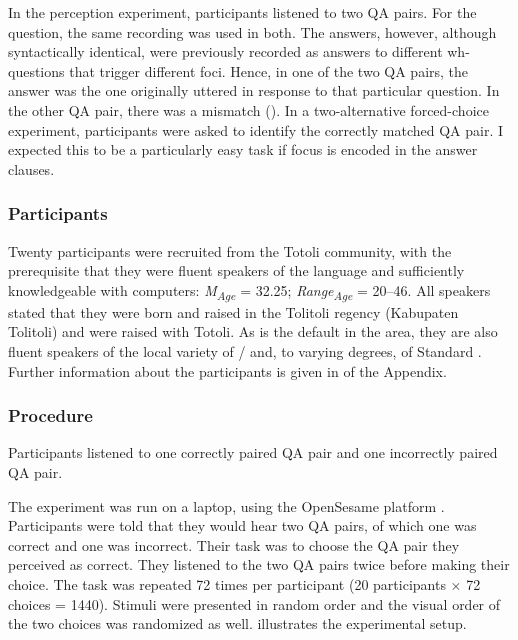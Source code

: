 In the perception experiment, participants listened to two QA pairs. For the question, the same recording was used in both. The answers, however, although syntactically identical, were previously recorded as answers to different wh-questions that trigger different foci. Hence, in one of the two QA pairs, the answer was the one originally uttered in response to that particular question. In the other QA pair, there was a mismatch (). In a two-alternative forced-choice experiment, participants were asked to identify the correctly matched QA pair. I expected this to be a particularly easy task if focus is encoded in the answer clauses.





\subsubsection{Participants}



Twenty participants were recruited from the Totoli community, with the prerequisite that they were fluent speakers of the language and sufficiently knowledgeable with computers: \textit{M\textsubscript{Age}} = 32.25; \textit{Range\textsubscript{Age}} = 20--46. All speakers stated that they were born and raised in the  Tolitoli regency (Kabupaten Tolitoli) and were raised with Totoli. As is the default in the area, they are also fluent speakers of the local variety of /  and, to varying degrees, of Standard . Further information about the participants is given in   of the Appendix. 




\subsubsection{Procedure}


Participants  listened to one correctly paired QA pair and one incorrectly paired QA pair.  

The experiment was run on a laptop, using the OpenSesame platform \citep{mathot2012opensesame}.  Participants were told that they would hear two QA pairs, of which one was correct and one was incorrect. Their task was to choose the QA pair they perceived as correct. They listened to the two QA pairs twice before making their choice. The task was repeated 72 times per participant (20 participants × 72 choices = 1440). Stimuli were presented in random order and the visual order of the two choices was randomized as well. 
 illustrates the experimental setup.


